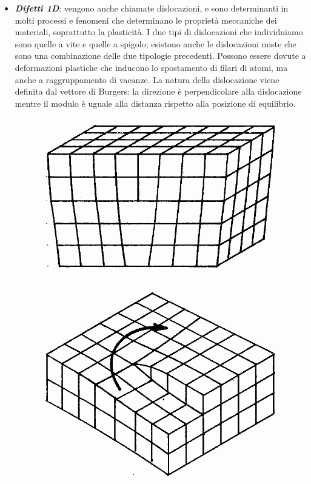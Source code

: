\begin{itemize}
\begin{figure}[h]
        \label{defects}
    \end{figure}
    \item \textbf{\textit{Difetti 1D}}: vengono anche chiamate dislocazioni, e sono determinanti in molti processi e fenomeni che determinano le proprietà meccaniche dei materiali, soprattutto la plasticità. I due tipi di dislocazioni che individuiamo sono quelle a vite e quelle a spigolo; esistono anche le dislocazioni miste che sono una combinazione delle due tipologie precedenti. Possono essere dovute a deformazioni plastiche che inducono lo spostamento di filari di atomi, ma anche a raggruppamento di vacanze. La natura della dislocazione viene definita dal vettore di Burgers: la direzione è perpendicolare alla dislocazione mentre il modulo è uguale alla distanza rispetto alla posizione di equilibrio.
        \begin{figure}[h]
    \centering
  \begin{minipage}[b]{0.4\linewidth}
    \centering
    \includegraphics[width=\linewidth]{struttura/screw_dislo.png}
    \label{screw}
  \end{minipage}
  \begin{minipage}[b]{0.4\linewidth}
    \centering
    \includegraphics[width=\linewidth]{struttura/Dislocation_hélicoïdale.png}
    \label{dislo}  


\end{minipage}
\end{figure}
\end{itemize}
